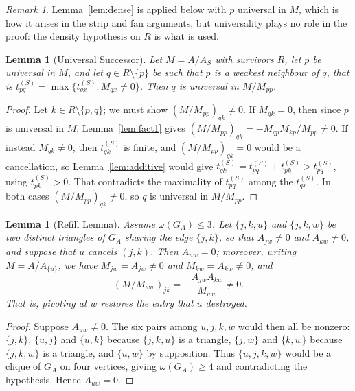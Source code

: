 \documentclass[11pt]{article}
\theoremstyle{plain}
\newtheorem{lemma}[theorem]{Lemma}
\theoremstyle{definition}
\theoremstyle{remark}
\newtheorem{remark}[theorem]{Remark}
\begin{document}
\begin{humanaiblock}
\begin{remark}\label{rem:dense-universal}
Lemma~\ref{lem:dense} is applied below with $p$ universal in $M$, which is how it arises in the strip
and fan arguments, but universality plays no role in the proof: the density hypothesis on $R$ is
what is used.
\end{remark}

\begin{lemma}[Universal Successor]\label{lem:univsucc}
Let $M=A/A_S$ with survivors $R$, let $p$ be universal in $M$, and let $q\in R\setminus\{p\}$ be such
that $p$ is a weakest neighbour of $q$, that is
$t^{(S)}_{pq}=\max\{t^{(S)}_{qx}:M_{qx}\neq0\}$. Then $q$ is universal in $M/M_{pp}$.
\end{lemma}

\begin{proof}
Let $k\in R\setminus\{p,q\}$; we must show $(M/M_{pp})_{qk}\neq0$. If $M_{qk}=0$, then since $p$ is
universal in $M$, Lemma~\ref{lem:fact1} gives $(M/M_{pp})_{qk}=-M_{qp}M_{kp}/M_{pp}\neq0$. If instead
$M_{qk}\neq0$, then $t^{(S)}_{qk}$ is finite, and $(M/M_{pp})_{qk}=0$ would be a cancellation, so
Lemma~\ref{lem:additive} would give
$t^{(S)}_{qk}=t^{(S)}_{pq}+t^{(S)}_{pk}>t^{(S)}_{pq}$, using $t^{(S)}_{pk}>0$. That contradicts the
maximality of $t^{(S)}_{pq}$ among the $t^{(S)}_{qx}$. In both cases
$(M/M_{pp})_{qk}\neq0$, so $q$ is universal in $M/M_{pp}$.
\end{proof}

\begin{lemma}[Refill Lemma]\label{lem:refill}
Assume $\omega(G_A)\le3$. Let $\{j,k,u\}$ and $\{j,k,w\}$ be two distinct triangles of $G_A$ sharing
the edge $\{j,k\}$, so that $A_{jw}\neq0$ and $A_{kw}\neq0$, and suppose that $u$ cancels $(j,k)$.
Then $A_{uw}=0$; moreover, writing $M=A/A_{\{u\}}$, we have $M_{jw}=A_{jw}\neq0$ and
$M_{kw}=A_{kw}\neq0$, and
\[(M/M_{ww})_{jk}=-\frac{A_{jw}A_{kw}}{M_{ww}}\neq0.\]
That is, pivoting at $w$ restores the entry that $u$ destroyed.
\end{lemma}

\begin{proof}
Suppose $A_{uw}\neq0$. The six pairs among $u,j,k,w$ would then all be nonzero: $\{j,k\}$, $\{u,j\}$
and $\{u,k\}$ because $\{j,k,u\}$ is a triangle, $\{j,w\}$ and $\{k,w\}$ because $\{j,k,w\}$ is a
triangle, and $\{u,w\}$ by supposition. Thus $\{u,j,k,w\}$ would be a clique of $G_A$ on four
vertices, giving $\omega(G_A)\ge4$ and contradicting the hypothesis. Hence $A_{uw}=0$.


\end{proof}
\end{humanaiblock}
\end{document}
